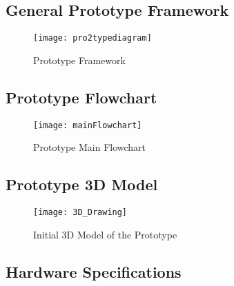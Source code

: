 \subsection{General Prototype Framework}
\begin{figure}[!htbp]
	\centering
	\texttt{[image: pro2typediagram]}
	\caption{Prototype Framework}
	\label{fig:prototypeDiagram_fig}
\end{figure}

\subsection{Prototype Flowchart}
\begin{figure}[!htbp]
	\centering
	\texttt{[image: mainFlowchart]}
	\caption{Prototype Main Flowchart}
	\label{fig:pro2typeDiagram_fig}
\end{figure}

\subsection{Prototype 3D Model}
\begin{figure}[!htbp]
	\centering
	\texttt{[image: 3D\_Drawing]}
	\caption{Initial 3D Model of the Prototype}
	\label{fig:3dModel_fig}
\end{figure}


\subsection{Hardware Specifications}


